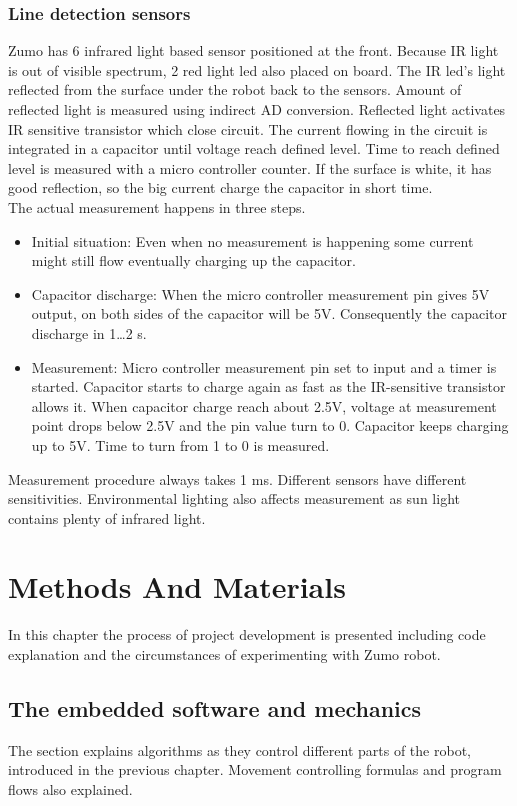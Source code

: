 \documentclass[11pt,a4paper,oneside,article]{memoir}
\begin{document}
\subsection{Line detection sensors}
Zumo has 6 infrared light based sensor positioned at the front. Because IR light is out of visible spectrum, 2 red light led also placed on board. The IR led's light reflected from the surface under the robot back to the sensors. Amount of reflected light is measured using indirect AD conversion. Reflected light activates IR sensitive transistor which close circuit. The current flowing in the circuit is integrated in a capacitor until voltage reach defined level. Time to reach defined level is measured with a micro controller counter. If the surface is white, it has good reflection, so the big current charge the capacitor in short time.\\
The actual measurement happens in three steps.
\begin{itemize}
	\item Initial situation: Even when no measurement is happening some current might still flow eventually charging up the capacitor.
	\item Capacitor discharge: When the micro controller measurement pin gives 5V output, on both sides of the capacitor will be 5V. Consequently the capacitor discharge in 1\ldots2 \textmu s.
	\item Measurement: Micro controller measurement pin set to input and a timer is started. Capacitor starts to charge again as fast as the IR-sensitive transistor allows it. When capacitor charge reach about 2.5V, voltage at measurement point drops below 2.5V and the pin value turn to 0. Capacitor keeps charging up to 5V. Time to turn from 1 to 0 is measured.
\end{itemize}
Measurement procedure always takes 1 ms. Different sensors have different sensitivities. Environmental lighting also affects measurement as sun light contains plenty of infrared light.\cite{Lectures}

\chapter{Methods And Materials}
In this chapter the process of project development is presented including code explanation and the circumstances of experimenting with Zumo robot.

\section{The embedded software and mechanics}
The section explains algorithms as they control different parts of the robot, introduced in the previous chapter. Movement controlling formulas and program flows also explained.
\end{document}
